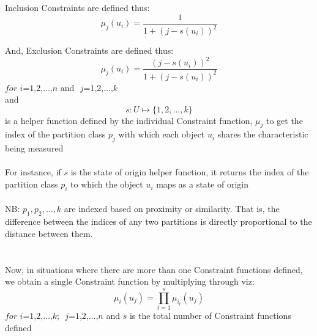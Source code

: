 \documentclass[a4paper]{book}
\begin{document}
			Inclusion Constraints are defined thus:
			\begin{equation}
				\mu_j(u_i) = \frac{1}{1+\left( j - s(u_i) \right)^2}
			\end{equation}
			
			And, Exclusion Constraints are defined thus:
			\begin{equation}
				\mu_j(u_i) = \frac{\left( j - s(u_i) \right)^2}{1+\left( j - s(u_i) \right)^2}
			\end{equation}
			$\textit{for i=1,2,}\dots\text{,}n$ and $\textit{ j=1,2,}\dots\text{,}k$\\
			and
			\begin{equation}
				s\colon U\mapsto \{ 1,2,\dots,k \}
			\end{equation}
			is a helper function defined by the individual Constraint function, $\mu_j$ to get the index of the partition class $p_j$ with which each object $u_i$ shares the characteristic being measured\\ \\
			For instance, if $s$ is the state of origin helper function, it returns the index of the partition class $p_i$ to which the object $u_i$ maps as a state of origin\\ \\
			NB: $p_1, p_2,\dots,k$ are indexed based on proximity or similarity. That is, the difference between the indices of any two partitions is directly proportional to the distance between them. \\ \\
		\paragraph{}
			Now, in situations where there are more than one Constraint functions defined, we obtain a single Constraint function by multiplying through viz:
			\begin{equation}
				\mu_i(u_j) = \prod_{t=1}^{s}{\mu_{i_t}(u_j)}
			\end{equation}
			$\textit{for i=1,2,}\dots\text{,}k$; $\textit{ j=1,2,}\dots\text{,}n$ and $s$ is the total number of Constraint functions defined
\end{document}
